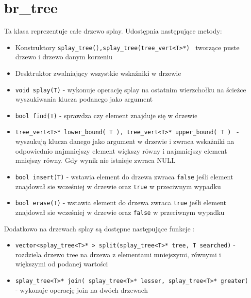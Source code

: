 \documentclass[declaration,shortabstract]{iithesis}
\theoremstyle{thm}
\theoremstyle{remark}
\theoremstyle{plain}
\theoremstyle{plain}
\theoremstyle{plain}
\begin{document}
\section{br\_tree}

Ta klasa reprezentuje całe drzewo splay. Udostępnia następujące metody: 

\begin{itemize}

\item{Konstruktory \texttt{splay\_tree(),splay\_tree(tree\_vert<T>*) } tworzące puste drzewo i drzewo danym korzeniu }

\item{Desktruktor zwalniający wszystkie wskaźniki w drzewie}

\item{\texttt{void splay(T)} - wykonuje operację splay na ostatnim wierzchołku na ścieżce wyszukiwania klucza podanego jako argument}

\item{\texttt{bool find(T)} - sprawdza czy element znajduje się w drzewie}
    
\item{\texttt{tree\_vert<T>* lower\_bound( T ), tree\_vert<T>* upper\_bound( T ) } - wyszukują klucza danego jako argument w drzewie i zwraca wskażniki na odpowiednio najmniejszy element większy równy i najmniejszy element mniejszy równy. Gdy wynik nie istnieje zwraca NULL }
   
\item{\texttt{bool insert(T)} - wstawia element do drzewa zwraca \texttt{false} jeśli element znajdował sie wcześniej w drzewie oraz \texttt{true} w przeciwnym wypadku}
\item{\texttt{bool erase(T)} - wstawia element do drzewa zwraca \texttt{true} jeśli element znajdował sie wcześniej w drzewie oraz \texttt{false} w przeciwnym wypadku}

\end{itemize}

Dodatkowo na drzewach splay są dostępne następujące funkcje : 

\begin{itemize}

\item{\texttt{vector<splay\_tree<T>* > split(splay\_tree<T>* tree, T searched)} - rozdziela drzewo tree na drzewa z elementami mniejszymi, równymi i większymi od podanej wartości}
\item{\texttt{splay\_tree<T>* join( splay\_tree<T>* lesser, splay\_tree<T>* greater)} - wykonuje operację join na dwóch drzewach}

\end{itemize}
\end{document}

